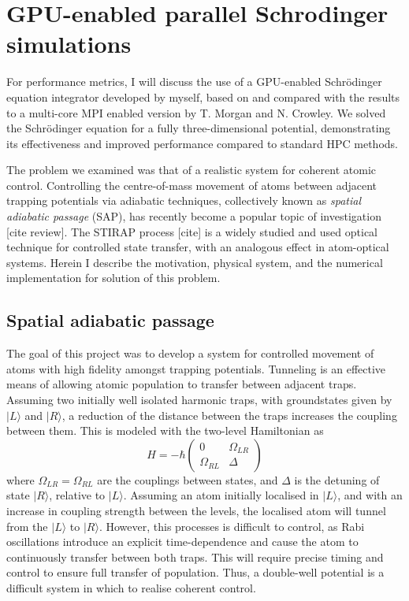 \section{GPU-enabled parallel Schrodinger simulations}
\label{sec:3D Stirap parallel Schrodinger simulations}
For performance metrics, I will discuss the use of a GPU-enabled Schr\"odinger equation integrator developed by myself, based on and compared with the results to a multi-core MPI enabled version by T. Morgan and N. Crowley. We solved the Schr\"odinger equation for a fully three-dimensional potential, demonstrating its effectiveness and improved performance compared to standard HPC methods.

The problem we examined was that of a realistic system for coherent atomic control. Controlling the centre-of-mass movement of atoms between adjacent trapping potentials via adiabatic techniques, collectively known as \textit{spatial adiabatic passage} (SAP), has recently become a popular topic of investigation [cite review]. The STIRAP process [cite] is a widely studied and used optical technique for controlled state transfer, with an analogous effect in atom-optical systems. Herein I describe the motivation, physical system, and the numerical implementation for solution of this problem.



\subsection{Spatial adiabatic passage}
The goal of this project was to develop a system for controlled movement of atoms with high fidelity amongst trapping potentials. Tunneling is an effective means of allowing atomic population to transfer between adjacent traps. Assuming two initially well isolated harmonic traps, with groundstates given by $| L \rangle$ and $| R \rangle$, a reduction of the distance between the traps increases the coupling between them. This is modeled with the two-level Hamiltonian as
\begin{equation}
    H = -\hbar
    \begin{pmatrix}
        0 & \Omega_{LR} \\
        \Omega_{RL} & \Delta
    \end{pmatrix}
\end{equation}
where $\Omega_{LR} = \Omega_{RL}$ are the couplings between states, and $\Delta$ is the detuning of state $| R \rangle$, relative to $| L \rangle$. Assuming an atom initially localised in $| L \rangle$, and with an increase in coupling strength between the levels, the localised atom will tunnel from the $| L \rangle$ to $| R \rangle $. However, this processes is difficult to control, as Rabi oscillations introduce an explicit time-dependence and cause the atom to continuously transfer between both traps. This will require precise timing and control to ensure full transfer of population. Thus, a double-well potential is a difficult system in which to realise coherent control.

